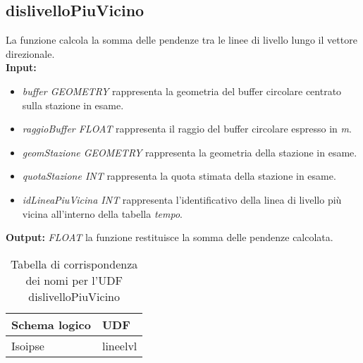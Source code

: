 \subsection{dislivelloPiuVicino}
La funzione calcola la somma delle pendenze tra le linee di livello lungo il vettore direzionale.\\
\textbf{Input:} 
\begin{itemize}
\item \textit{buffer GEOMETRY} rappresenta la geometria del buffer circolare centrato sulla stazione in esame.
\item \textit{raggioBuffer FLOAT} rappresenta il raggio del buffer circolare espresso in \textit{m}.
\item \textit{geomStazione GEOMETRY} rappresenta la geometria della stazione in esame.
\item \textit{quotaStazione INT} rappresenta la quota stimata della stazione in esame.
\item \textit{idLineaPiuVicina INT} rappresenta l'identificativo della linea di livello più vicina all'interno della tabella \textit{tempo}.
\end{itemize}
\textbf{Output:} \textit{FLOAT} la funzione restituisce la somma delle pendenze calcolata. 

\begin{table}[h]
\centering
\caption{Tabella di corrispondenza dei nomi per l'UDF dislivelloPiuVicino}
\label{mapTb3}
\begin{tabular}{|l|l|}
\hline
Schema logico & UDF      \\ \hline
Isoipse       & lineelvl \\ \hline
\end{tabular}
\end{table} 

